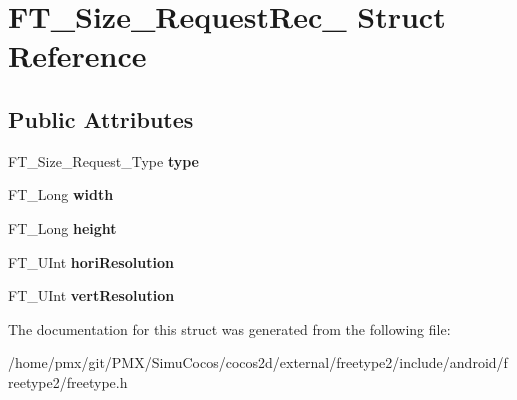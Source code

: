 \hypertarget{structFT__Size__RequestRec__}{}\section{F\+T\+\_\+\+Size\+\_\+\+Request\+Rec\+\_\+ Struct Reference}
\label{structFT__Size__RequestRec__}
\subsection*{Public Attributes}
\begin{DoxyCompactItemize}
\item 
\mbox{\label{structFT__Size__RequestRec___a7644b04dd2b26c0698df558775320494}} 
F\+T\+\_\+\+Size\+\_\+\+Request\+\_\+\+Type {\bfseries type}
\item 
\mbox{\label{structFT__Size__RequestRec___a7b044d36af318b053d5e3939eb0d5039}} 
F\+T\+\_\+\+Long {\bfseries width}
\item 
\mbox{\label{structFT__Size__RequestRec___af8142450d8d032e1870d758cdcfa51a9}} 
F\+T\+\_\+\+Long {\bfseries height}
\item 
\mbox{\label{structFT__Size__RequestRec___a3a85704d13561d9db53aa60f7805ec73}} 
F\+T\+\_\+\+U\+Int {\bfseries hori\+Resolution}
\item 
\mbox{\label{structFT__Size__RequestRec___a86601c38d91064b6efe256a9e99c56f4}} 
F\+T\+\_\+\+U\+Int {\bfseries vert\+Resolution}
\end{DoxyCompactItemize}


The documentation for this struct was generated from the following file\+:\begin{DoxyCompactItemize}
\item 
/home/pmx/git/\+P\+M\+X/\+Simu\+Cocos/cocos2d/external/freetype2/include/android/freetype2/freetype.\+h\end{DoxyCompactItemize}
